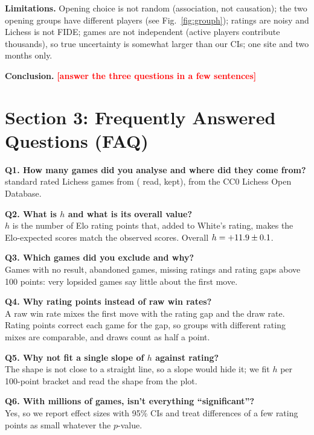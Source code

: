 \documentclass[11pt,a4paper]{article}
\newcommand{\TBD}[1]{\textcolor{red}{\textbf{[#1]}}}
\begin{document}
\textbf{Limitations.} Opening choice is not random (association, not causation); the two opening
groups have different players (see Fig.~\ref{fig:grouph}); ratings are noisy and Lichess is not
FIDE; games are not independent (active players contribute thousands), so true uncertainty is
somewhat larger than our CIs; one site and two months only.

\textbf{Conclusion.} \TBD{answer the three questions in a few sentences}


\newpage

\section*{Section 3: Frequently Answered Questions (FAQ)}

\textbf{Q1. How many games did you analyse and where did they come from?}\\
\GamesUsed{} standard rated Lichess games from \MonthList{} (\GamesRead{} read, \PctUsed{} kept),
from the CC0 Lichess Open Database.

\textbf{Q2. What is $h$ and what is its overall value?}\\
$h$ is the number of Elo rating points that, added to White's rating, makes the Elo-expected
scores match the observed scores. Overall $h=+11.9\pm0.1$.

\textbf{Q3. Which games did you exclude and why?}\\
Games with no result, abandoned games, missing ratings and rating gaps above 100 points: very
lopsided games say little about the first move.

\textbf{Q4. Why rating points instead of raw win rates?}\\
A raw win rate mixes the first move with the rating gap and the draw rate. Rating points correct
each game for the gap, so groups with different rating mixes are comparable, and draws count
as half a point.

\textbf{Q5. Why not fit a single slope of $h$ against rating?}\\
The shape is not close to a straight line, so a slope would hide it; we fit $h$ per
100-point bracket and read the shape from the plot.

\textbf{Q6. With millions of games, isn't everything ``significant''?}\\
Yes, so we report effect sizes with 95\% CIs and treat differences of a few rating points as
small whatever the $p$-value.
\end{document}
